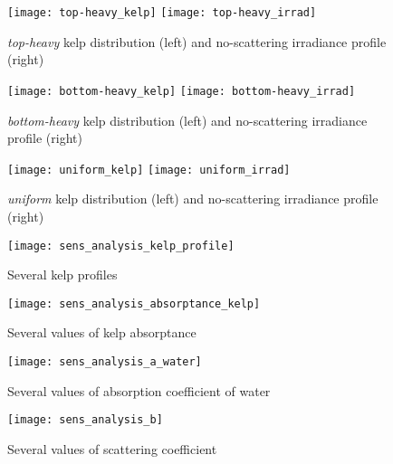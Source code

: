 \begin{figure}[H]
  \centering
  \vspace{-3em}
  \texttt{[image: top-heavy\_kelp]}
  \texttt{[image: top-heavy\_irrad]}
  \caption{\textit{top-heavy} kelp distribution (left) and no-scattering irradiance profile (right)}
\end{figure}

\begin{figure}[H]
  \centering
  \vspace{-3em}
  \texttt{[image: bottom-heavy\_kelp]}
  \texttt{[image: bottom-heavy\_irrad]}
  \caption{\textit{bottom-heavy} kelp distribution (left) and no-scattering irradiance profile (right)}
\end{figure}

\begin{figure}[H]
  \centering
  \vspace{-3em}
  \texttt{[image: uniform\_kelp]}
  \texttt{[image: uniform\_irrad]}
  \caption{\textit{uniform} kelp distribution (left) and no-scattering irradiance profile (right)}
\end{figure}

\begin{figure}[H]
  \centering
  \texttt{[image: sens\_analysis\_kelp\_profile]}
  \caption{Several kelp profiles}
\end{figure}

\begin{figure}[H]
  \centering
  \texttt{[image: sens\_analysis\_absorptance\_kelp]}
  \caption{Several values of kelp absorptance}
\end{figure}

\begin{figure}[H]
  \centering
  \texttt{[image: sens\_analysis\_a\_water]}
  \caption{Several values of absorption coefficient of water}
  \label{fig:sens_analysis_a_water}
\end{figure}

\begin{figure}[H]
  \centering
  \texttt{[image: sens\_analysis\_b]}
  \caption{Several values of scattering coefficient}
  \label{fig:sens_analysis_b}
\end{figure}
